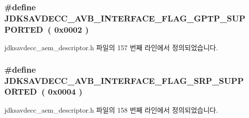 \subsubsection[{\texorpdfstring{J\+D\+K\+S\+A\+V\+D\+E\+C\+C\+\_\+\+A\+V\+B\+\_\+\+I\+N\+T\+E\+R\+F\+A\+C\+E\+\_\+\+F\+L\+A\+G\+\_\+\+G\+P\+T\+P\+\_\+\+S\+U\+P\+P\+O\+R\+T\+ED}{JDKSAVDECC_AVB_INTERFACE_FLAG_GPTP_SUPPORTED}}]{\setlength{\rightskip}{0pt plus 5cm}\#define J\+D\+K\+S\+A\+V\+D\+E\+C\+C\+\_\+\+A\+V\+B\+\_\+\+I\+N\+T\+E\+R\+F\+A\+C\+E\+\_\+\+F\+L\+A\+G\+\_\+\+G\+P\+T\+P\+\_\+\+S\+U\+P\+P\+O\+R\+T\+ED~( 0x0002 )}\hypertarget{group__avb__interface__flags_gadc2669c70c7cb15acdbb0f426dd7c626}{}\label{group__avb__interface__flags_gadc2669c70c7cb15acdbb0f426dd7c626}


jdksavdecc\+\_\+aem\+\_\+descriptor.\+h 파일의 157 번째 라인에서 정의되었습니다.

\subsubsection[{\texorpdfstring{J\+D\+K\+S\+A\+V\+D\+E\+C\+C\+\_\+\+A\+V\+B\+\_\+\+I\+N\+T\+E\+R\+F\+A\+C\+E\+\_\+\+F\+L\+A\+G\+\_\+\+S\+R\+P\+\_\+\+S\+U\+P\+P\+O\+R\+T\+ED}{JDKSAVDECC_AVB_INTERFACE_FLAG_SRP_SUPPORTED}}]{\setlength{\rightskip}{0pt plus 5cm}\#define J\+D\+K\+S\+A\+V\+D\+E\+C\+C\+\_\+\+A\+V\+B\+\_\+\+I\+N\+T\+E\+R\+F\+A\+C\+E\+\_\+\+F\+L\+A\+G\+\_\+\+S\+R\+P\+\_\+\+S\+U\+P\+P\+O\+R\+T\+ED~( 0x0004 )}\hypertarget{group__avb__interface__flags_ga93e1477788a2f951bf433df0793e19f0}{}\label{group__avb__interface__flags_ga93e1477788a2f951bf433df0793e19f0}


jdksavdecc\+\_\+aem\+\_\+descriptor.\+h 파일의 158 번째 라인에서 정의되었습니다.

